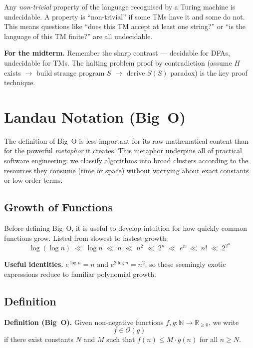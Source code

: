 \documentclass[11pt, a4paper]{article}
\theoremstyle{definition}
\theoremstyle{remark}
\begin{document}
Any \emph{non-trivial} property of the language recognised by a Turing machine is
undecidable.  A property is ``non-trivial'' if some TMs have it and some do not.  This means
questions like ``does this TM accept at least one string?'' or ``is the language of this TM
finite?'' are all undecidable.

\begin{notebox}
\textbf{For the midterm.}  Remember the sharp contrast --- decidable for DFAs, undecidable
for TMs.  The halting problem proof by contradiction (assume $H$ exists $\to$ build strange
program $S$ $\to$ derive $S(S)$ paradox) is the key proof technique.
\end{notebox}

\section{Landau Notation (Big~O)}

The definition of Big~O is less important for its raw mathematical content than for the
powerful \emph{metaphor} it creates.  This metaphor underpins all of practical software
engineering: we classify algorithms into broad clusters according to the resources they
consume (time or space) without worrying about exact constants or low-order terms.

\subsection{Growth of Functions}

Before defining Big~O, it is useful to develop intuition for how quickly common functions
grow.  Listed from slowest to fastest growth:
\[
  \log(\log n)
  \;\ll\;
  \log n
  \;\ll\;
  n
  \;\ll\;
  n^2
  \;\ll\;
  2^n
  \;\ll\;
  e^n
  \;\ll\;
  n!
  \;\ll\;
  2^{2^n}
\]

\begin{notebox}
\textbf{Useful identities.}
$e^{\log n}=n$ and $e^{2\log n}=n^2$, so these seemingly
exotic expressions reduce to familiar polynomial growth.
\end{notebox}

\subsection{Definition}

\begin{defbox}
\textbf{Definition (Big~O).}
Given non-negative functions $f,g\colon\mathbb{N}\to\mathbb{R}_{\geq 0}$, we write
\[
  f\in\mathcal{O}(g)
\]
if there exist constants $N$ and $M$ such that $f(n)\leq M\cdot g(n)$ for all $n\geq N$.
\end{defbox}
\end{document}
